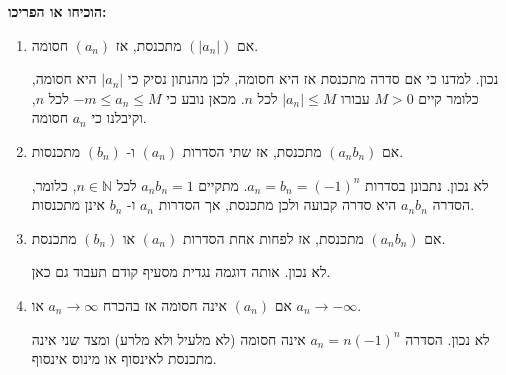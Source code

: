 \textbf{הוכיחו או הפריכו:}
\begin{enumerate}
    \item
    אם
    $(|a_n|)$
    מתכנסת, אז
    $(a_n)$
    חסומה.
\begin{solbox}
 נכון.
          למדנו כי אם סדרה מתכנסת אז היא חסומה, לכן מהנתון נסיק כי
          $|a_n|$
           היא חסומה, כלומר קיים
           $M>0$
           עבורו
           $|a_n|\le M$
           לכל
           $n$.
           מכאן נובע כי
           $-m\le a_n\le M$
           לכל
           $n$,
           וקיבלנו כי
           $a_n$
           חסומה.
\end{solbox}
    \item אם
    $(a_nb_n)$
    מתכנסת, אז שתי הסדרות
    $(a_n)$
    ו-
    $(b_n)$
    מתכנסות.
\begin{solbox}
לא נכון.
נתבונן בסדרות
    $a_n=b_n=(-1)^n$.
    מתקיים
    $a_nb_n=1$
    לכל
    $n\in\mathbb{N}$,
    כלומר,
    הסדרה
    $a_nb_n$
    היא סדרה קבועה ולכן מתכנסת, אך הסדרות
    $a_n$
    ו-
    $b_n$
    אינן מתכנסות.
\end{solbox}
    \item אם
    $(a_nb_n)$
    מתכנסת, אז לפחות אחת הסדרות
    $(a_n)$
    או
    $(b_n)$
    מתכנסת.
\begin{solbox}
        לא נכון. אותה דוגמה נגדית מסעיף קודם תעבוד גם כאן.
\end{solbox}
    \item
    אם
    $(a_n)$
    אינה חסומה אז בהכרח
    $a_n\to \infty$
    או
    $a_n\to-\infty$.
\begin{solbox}
        לא נכון. הסדרה
        $a_n=n(-1)^n$
        אינה חסומה (לא מלעיל ולא מלרע) ומצד שני אינה מתכנסת לאינסוף או מינוס אינסוף.


\end{solbox}
\end{enumerate}
